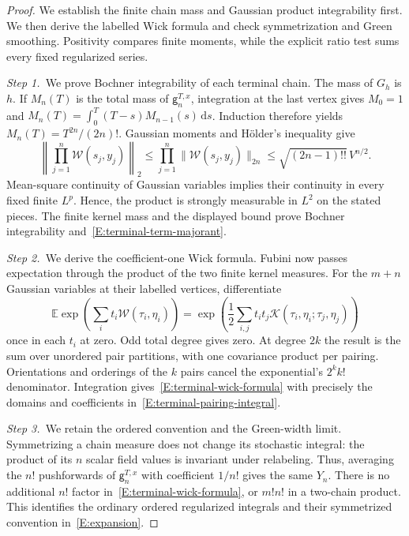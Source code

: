 \documentclass[12pt,oneside,openany]{book}
\numberwithin{equation}{section}
\theoremstyle{nogostyle}
\theoremstyle{definition}
\newcommand{\E}{\mathbb{E}}
\newcommand{\ud}{\,\mathrm{d}}
\begin{document}
\begin{proof}
  We establish the finite chain mass and Gaussian product integrability first.
  We then derive the labelled Wick formula and check symmetrization and Green
  smoothing. Positivity compares finite moments, while the explicit ratio test
  sums every fixed regularized series.


  \medskip
  \noindent\textit{Step 1.~}We prove Bochner integrability of each terminal
  chain.
  The mass of $G_h$ is $h$. If $M_n(T)$ is the total mass of
  $\mathsf{g}_n^{T,x}$, integration at the last vertex gives $M_0 = 1$ and
  $M_n(T) = \int_0^T(T-s)M_{n-1}(s)\ud s$. Induction therefore yields $M_n(T) =
  T^{2n}/(2n)!$. Gaussian moments and H\"older's inequality give
  \[
    \left\|\prod_{j=1}^n\mathcal{W}(s_j,y_j)\right\|_2
    \le\prod_{j=1}^n\|\mathcal{W}(s_j,y_j)\|_{2n}
    \le\sqrt{(2n-1)!!}\,V^{n/2}.
  \]
  Mean-square continuity of Gaussian variables implies their continuity in every
  fixed finite $L^p$. Hence, the product is strongly measurable in $L^2$ on the
  stated pieces. The finite kernel mass and the displayed bound prove Bochner
  integrability and~\eqref{E:terminal-term-majorant}.


  \medskip
  \noindent\textit{Step 2.~}We derive the coefficient-one Wick formula.
  Fubini now passes expectation through the product of the two finite kernel
  measures. For the $m+n$ Gaussian variables at their labelled vertices,
  differentiate
  \[
    \E\exp\left(\sum_i t_i\mathcal{W}(\tau_i,\eta_i)\right)
    =\exp\left(\frac12\sum_{i,j}t_i t_j
    \mathcal{K}(\tau_i,\eta_i;\tau_j,\eta_j)\right)
  \]
  once in each $t_i$ at zero. Odd total degree gives zero. At degree $2k$ the
  result is the sum over unordered pair partitions, with one covariance product
  per pairing. Orientations and orderings of the $k$ pairs cancel the
  exponential's $2^k k!$ denominator. Integration
  gives~\eqref{E:terminal-wick-formula} with precisely the domains and
  coefficients in~\eqref{E:terminal-pairing-integral}.


  \medskip
  \noindent\textit{Step 3.~}We retain the ordered convention and the
  Green-width limit.
  Symmetrizing a chain measure does not change its stochastic integral: the
  product of its $n$ scalar field values is invariant under relabeling. Thus,
  averaging the $n!$ pushforwards of $\mathsf{g}_n^{T,x}$ with coefficient
  $1/n!$ gives the same $Y_n$. There is no additional $n!$ factor
  in~\eqref{E:terminal-wick-formula}, or $m!n!$ in a two-chain product. This
  identifies the ordinary ordered regularized integrals and their symmetrized
  convention in~\eqref{E:expansion}.


\end{proof}
\end{document}
